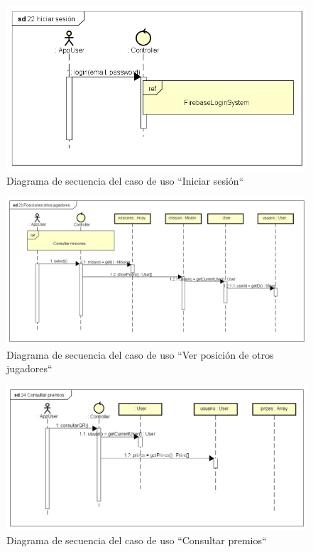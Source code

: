 \documentclass[twoside]{report}
\begin{document}
\begin{figure}[H]
\includegraphics[scale=0.5]{images/sequence/login}
\caption{Diagrama de secuencia del caso de uso “Iniciar sesión“}
\end{figure}

\begin{figure}[H]
\includegraphics[scale=0.5]{images/sequence/showOtherPlayersPositions}
\caption{Diagrama de secuencia del caso de uso “Ver posición de otros jugadores“}
\end{figure}

\begin{figure}[H]
\includegraphics[scale=0.5]{images/sequence/checkPrizes}
\caption{Diagrama de secuencia del caso de uso “Consultar premios“}
\end{figure}
\end{document}

